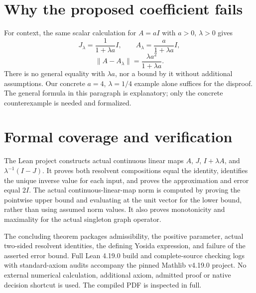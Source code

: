 \documentclass[11pt,a4paper]{article}
\begin{document}
\section*{Why the proposed coefficient fails}
For context, the same scalar calculation for $A=aI$ with $a>0$, $\lambda>0$ gives
\[
 J_\lambda=\frac1{1+\lambda a}I,\qquad
 A_\lambda=\frac a{1+\lambda a}I,
\]
\[
 \|A-A_\lambda\|=\frac{\lambda a^2}{1+\lambda a}.
\]
There is no general equality with $\lambda a$, nor a bound by it without additional assumptions. Our concrete $a=4$, $\lambda=1/4$ example alone suffices for the disproof. The general formula in this paragraph is explanatory; only the concrete counterexample is needed and formalized.

\section*{Formal coverage and verification}
The Lean project constructs actual continuous linear maps $A$, $J$, $I+\lambda A$, and $\lambda^{-1}(I-J)$. It proves both resolvent compositions equal the identity, identifies the unique inverse value for each input, and proves the approximation and error equal $2I$. The actual continuous-linear-map norm is computed by proving the pointwise upper bound and evaluating at the unit vector for the lower bound, rather than using assumed norm values. It also proves monotonicity and maximality for the actual singleton graph operator.

The concluding theorem packages admissibility, the positive parameter, actual two-sided resolvent identities, the defining Yosida expression, and failure of the asserted error bound. Full Lean 4.19.0 build and complete-source checking logs with standard-axiom audits accompany the pinned Mathlib v4.19.0 project. No external numerical calculation, additional axiom, admitted proof or native decision shortcut is used. The compiled PDF is inspected in full.
\end{document}
